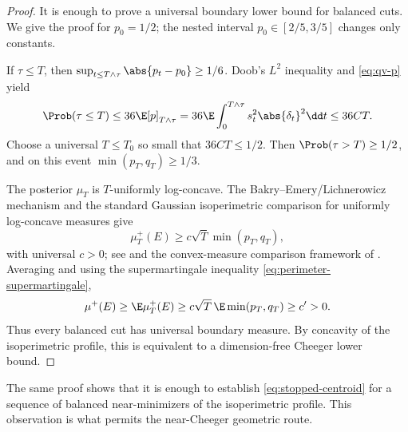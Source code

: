 \documentclass[../../main.tex]{subfiles}
\begin{document}
\begin{proof}
It is enough to prove a universal boundary lower bound for balanced cuts. We give the proof for
$p_0=1/2$; the nested interval $p_0\in[2/5,3/5]$ changes only constants.

If $\tau\le T$, then $\sup_{t\le T\wedge\tau}\abs{p_t-p_0}\ge1/6$. Doob's $L^2$ inequality and
\eqref{eq:qv-p} yield
\[
  \Prob(\tau\le T)
  \le36\E[p]_{T\wedge\tau}
  =36\E\int_0^{T\wedge\tau}s_t^2\abs{\delta_t}^2\dd t
  \le36CT .
\]
Choose a universal $T\le T_0$ so small that $36CT\le1/2$. Then $\Prob(\tau>T)\ge1/2$, and on this
event $\min(p_T,q_T)\ge1/3$.

The posterior $\mu_T$ is $T$-uniformly log-concave. The Bakry--Emery/Lichnerowicz mechanism and the
standard Gaussian isoperimetric comparison for uniformly log-concave measures give
\[
  \mu_T^+(E)\ge c\sqrt T\min(p_T,q_T),
\]
with universal $c>0$; see \cite{BakryGentilLedoux2014} and the convex-measure comparison framework
of \cite{Bobkov1999LogConcave,Milman2009Isoperimetric}. Averaging and using the supermartingale inequality
\eqref{eq:perimeter-supermartingale},
\[
  \mu^+(E)
  \ge \E\mu_T^+(E)
  \ge c\sqrt T\,\E\min(p_T,q_T)
  \ge c'>0 .
\]
Thus every balanced cut has universal boundary measure. By concavity of the isoperimetric profile,
this is equivalent to a dimension-free Cheeger lower bound.
\end{proof}

The same proof shows that it is enough to establish \eqref{eq:stopped-centroid} for a sequence of
balanced near-minimizers of the isoperimetric profile. This observation is what permits the
near-Cheeger geometric route.
\end{document}
